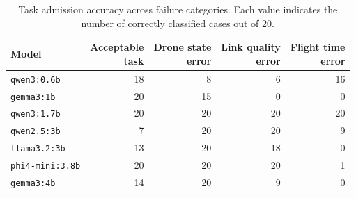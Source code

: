 \begin{table}[htbp]
\centering
\caption[Task admission accuracy across failure categories.]
{Task admission accuracy across failure categories. Each value indicates the number of correctly classified cases out of 20.}
\label{tab:task_admission_accuracy}
\small
\begin{tabular}{lrrrr}
\toprule
Model 
& \makecell[r]{Acceptable\\task} 
& \makecell[r]{Drone state\\error} 
& \makecell[r]{Link quality\\error} 
& \makecell[r]{Flight time\\error} \\
\midrule
\texttt{qwen3:0.6b}       & 18 & 8  & 6  & 16 \\
\texttt{gemma3:1b}        & 20 & 15 & 0  & 0  \\
\texttt{qwen3:1.7b}       & 20 & 20 & 20 & 20 \\
\texttt{qwen2.5:3b}       & 7  & 20 & 20 & 9  \\
\texttt{llama3.2:3b}      & 13 & 20 & 18 & 0  \\
\texttt{phi4-mini:3.8b}   & 20 & 20 & 20 & 1  \\
\texttt{gemma3:4b}        & 14 & 20 & 9  & 0  \\
\bottomrule
\end{tabular}
\end{table}
